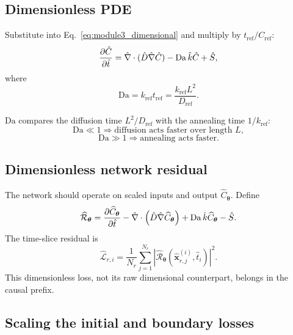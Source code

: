 \documentclass[11pt]{article}
\newcommand{\thetav}{\bm{\theta}}
\newcommand{\xv}{\bm{x}}
\newcommand{\Dref}{D_{\mathrm{ref}}}
\newcommand{\kref}{k_{\mathrm{ref}}}
\newcommand{\Cref}{C_{\mathrm{ref}}}
\newcommand{\tref}{t_{\mathrm{ref}}}
\newcommand{\Da}{\mathrm{Da}}
\begin{document}
\subsection{Dimensionless PDE}

Substitute into Eq.~\eqref{eq:module3_dimensional} and multiply by $\tref/\Cref$:
\begin{equation}
\pdv{\hat{C}}{\hat{t}}
=
\hat{\nabla}\cdot(\hat{D}\hat{\nabla}\hat{C})
-\Da\,\hat{k}\hat{C}
+\hat{S},
\label{eq:dimensionless_pde}
\end{equation}
where
\begin{equation}
\Da=\kref\tref=\frac{\kref L^2}{\Dref}.
\label{eq:damkohler}
\end{equation}

$\Da$ compares the diffusion time $L^2/\Dref$ with the annealing time $1/\kref$:
\begin{equation}
\Da\ll1
\Rightarrow
\text{diffusion acts faster over length }L,
\end{equation}
\begin{equation}
\Da\gg1
\Rightarrow
\text{annealing acts faster}.
\end{equation}

\subsection{Dimensionless network residual}

The network should operate on scaled inputs and output $\widehat{C}_{\thetav}$. Define
\begin{equation}
\widehat{\mathcal{R}}_{\thetav}
=
\pdv{\widehat{C}_{\thetav}}{\hat{t}}
-\hat{\nabla}\cdot
\left(
\hat{D}\hat{\nabla}\widehat{C}_{\thetav}
\right)
+\Da\,\hat{k}\widehat{C}_{\thetav}
-\hat{S}.
\label{eq:dimensionless_residual}
\end{equation}
The time-slice residual is
\begin{equation}
\widehat{\mathcal{L}}_{r,i}
=
\frac{1}{N_r}\sum_{j=1}^{N_r}
\left|
\widehat{\mathcal{R}}_{\thetav}
(\hat{\xv}_{r,j}^{(i)},\hat{t}_i)
\right|^2.
\label{eq:dimensionless_slice_residual}
\end{equation}
This dimensionless loss, not its raw dimensional counterpart, belongs in the causal prefix.

\subsection{Scaling the initial and boundary losses}
\end{document}
